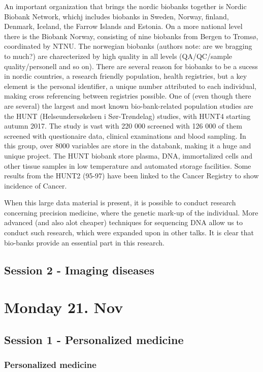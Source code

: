 \documentclass[12p]{article}
\begin{document}
An important organization that brings the nordic biobanks together is Nordic Biobank Network, whichj includes biobanks in Sweden, Norway, finland, Denmark, Iceland, the Farrow Islands and Estonia.
On a more national level there is the Biobank Norway, consisting of nine biobanks from Bergen to Tromsø, coordinated by NTNU.
The norwegian biobanks (authors note: are we bragging to much?) are charecterized by high quality in all levels (QA/QC/sample quality/personell and so on).
There are several reason for biobanks to be a sucess in nordic countries, a research friendly population, health registries, but a key element is the personal identifier, a unique number attributed to each individual, making cross referencing between registries possible.
One of (even though there are several) the largest and most known bio-bank-related population studies are the HUNT (Helseundersøkelsen i Sør-Trøndelag) studies, with HUNT4 starting autumn 2017.
The study is vast with 220 000 screened with 126 000 of them screened with questionaire data, clinical examinations and blood sampling.
In this group, over 8000 variables are store in the databank, making it a huge and unique project.
The HUNT biobank store plasma, DNA, immortalized cells and other tissue samples in low temperature and automated storage facilities.
Some results from the HUNT2 (95-97) have been linked to the Cancer Registry to show incidence of Cancer.

When this large data material is present, it is possible to conduct research concerning precision medicine, where the genetic mark-up of the individual.
More advanced (and also alot cheaper) techniques for sequencing DNA allow us to conduct such research, which were expanded upon in other talks.
It is clear that bio-banks provide an essential part in this research.

\subsection*{Session 2 - Imaging diseases}


\section*{Monday 21. Nov}

\subsection*{Session 1 - Personalized medicine}

\subsubsection{Personalized medicine}
\end{document}
